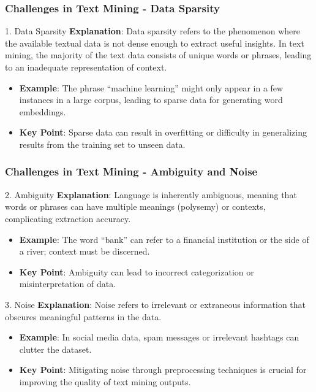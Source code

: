 \documentclass[aspectratio=169]{beamer}
\begin{document}
\begin{frame}[fragile]
    \frametitle{Challenges in Text Mining - Data Sparsity}
    \begin{block}{1. Data Sparsity}
        \textbf{Explanation}: Data sparsity refers to the phenomenon where the available textual data is not dense enough to extract useful insights. In text mining, the majority of the text data consists of unique words or phrases, leading to an inadequate representation of context.
    \end{block}
    \begin{itemize}
        \item \textbf{Example}: The phrase “machine learning” might only appear in a few instances in a large corpus, leading to sparse data for generating word embeddings.
        \item \textbf{Key Point}: Sparse data can result in overfitting or difficulty in generalizing results from the training set to unseen data.
    \end{itemize}
\end{frame}

\begin{frame}[fragile]
    \frametitle{Challenges in Text Mining - Ambiguity and Noise}
    \begin{block}{2. Ambiguity}
        \textbf{Explanation}: Language is inherently ambiguous, meaning that words or phrases can have multiple meanings (polysemy) or contexts, complicating extraction accuracy.
    \end{block}
    \begin{itemize}
        \item \textbf{Example}: The word “bank” can refer to a financial institution or the side of a river; context must be discerned.
        \item \textbf{Key Point}: Ambiguity can lead to incorrect categorization or misinterpretation of data.
    \end{itemize}

    \vspace{0.5cm} %

    \begin{block}{3. Noise}
        \textbf{Explanation}: Noise refers to irrelevant or extraneous information that obscures meaningful patterns in the data.
    \end{block}
    \begin{itemize}
        \item \textbf{Example}: In social media data, spam messages or irrelevant hashtags can clutter the dataset.
        \item \textbf{Key Point}: Mitigating noise through preprocessing techniques is crucial for improving the quality of text mining outputs.
    \end{itemize}
\end{frame}
\end{document}

